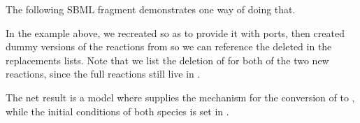 The following SBML fragment demonstrates one way of doing that.


In the example above, we recreated  so as to provide it with
ports, then created dummy versions of the reactions from
 so we can reference the deleted  in
the replacements lists.  Note that we list the deletion of 
for both of the two new reactions, since the full reactions still live
in .

The net result is a model where  supplies the mechanism
for the conversion of  to , while the initial conditions of
both species is set in .
